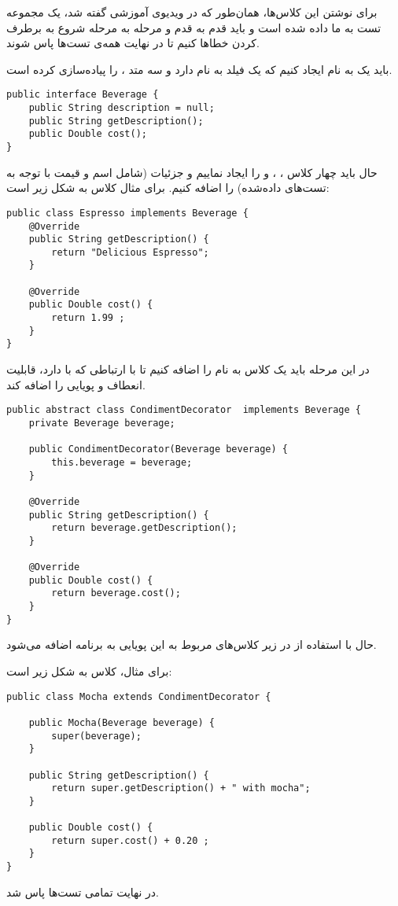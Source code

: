 
برای نوشتن این کلاس‌ها، همان‌طور که در ویدیوی آموزشی گفته شد، یک مجموعه تست به ما داده شده است و باید قدم به قدم و مرحله به مرحله شروع به برطرف کردن خطاها کنیم تا در نهایت همه‌ی تست‌ها پاس شوند.

باید یک  به نام  ایجاد کنیم که یک فیلد به نام  دارد و  سه متد ،  را پیاده‌سازی کرده است. 

\begin{Verbatim}[tabsize=4]
public interface Beverage {
	public String description = null;
	public String getDescription();
	public Double cost();
}
\end{Verbatim}

حال باید چهار کلاس ، ،  و  را ایجاد نماییم و جزئیات (شامل اسم و قیمت با توجه به تست‌های داده‌شده) را اضافه کنیم. برای مثال کلاس  به شکل زیر است:

\begin{Verbatim}[tabsize=4]
public class Espresso implements Beverage {
	@Override
	public String getDescription() {
		return "Delicious Espresso";
	}
	
	@Override
	public Double cost() {
		return 1.99 ;
	}
}
\end{Verbatim}

در این مرحله باید یک کلاس  به نام  را اضافه کنیم تا با ارتباطی که با  دارد، قابلیت انعطاف و پویایی را اضافه کند. 



\begin{Verbatim}[tabsize=4]
public abstract class CondimentDecorator  implements Beverage {
	private Beverage beverage;
	
	public CondimentDecorator(Beverage beverage) {
		this.beverage = beverage;
	}
	
	@Override
	public String getDescription() {
		return beverage.getDescription();
	}
	
	@Override
	public Double cost() {
		return beverage.cost();
	}
}
\end{Verbatim}

حال با استفاده از  در زیر کلاس‌های مربوط به  این پویایی به برنامه اضافه می‌شود.

برای مثال، کلاس  به شکل زیر است:

\begin{Verbatim}[tabsize=4]
public class Mocha extends CondimentDecorator {

	public Mocha(Beverage beverage) {
		super(beverage);
	}
	
	public String getDescription() {
		return super.getDescription() + " with mocha";
	}
	
	public Double cost() {
		return super.cost() + 0.20 ;
	}
}
\end{Verbatim}
در نهایت تمامی تست‌ها پاس شد.

